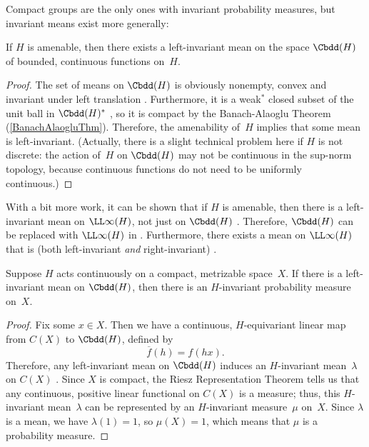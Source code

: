 Compact groups are the only ones with invariant probability measures, but invariant means exist more generally:

\begin{prop}[($\ref{AmenEquiv-amen} \Rightarrow \ref{AmenEquiv-Mean}$)] \label{Amen->Mean}
If $H$ is amenable, then there exists a left-invariant mean on the space $\Cbdd(H)$ of bounded, continuous functions on~$H$.
\end{prop}

\begin{proof}
The set of means on $\Cbdd(H)$ is obviously nonempty, convex and invariant under left translation . Furthermore, it is a weak$^*$ closed subset of the unit ball in $\Cbdd(H)^*$ , so it is compact by the Banach-Alaoglu Theorem (\cref{BanachAlaogluThm}).
Therefore, the amenability of~$H$ implies that some mean is left-invariant.
(Actually, there is a slight technical problem here if $H$ is not discrete: the action of~$H$ on $\Cbdd(H)$ may not be continuous in the sup-norm topology, because continuous functions do not need to be uniformly continuous.)
 \end{proof}

\begin{rem} \label{Amen<>MeanLinfty}
With a bit more work, it can be shown that if $H$ is amenable, then there is a left-invariant mean on $\LL\infty(H)$, not just on $\Cbdd(H)$ .
Therefore, $\Cbdd(H)$ can be replaced with $\LL\infty(H)$ in .
Furthermore, there exists a mean on $\LL\infty(H)$ that is  (both left-invariant \emph{and} right-invariant) .
\end{rem}

\begin{prop}[($\ref{AmenEquiv-Mean} \Rightarrow \ref{AmenEquiv-InvMeas}$)]
Suppose $H$ acts continuously on a compact, metrizable space~$X$. If there is a left-invariant mean on $\Cbdd(H)$, then there is an $H$-invariant probability measure on~$X$.
\end{prop}

\begin{proof}
 Fix some $x \in X$. Then we have a continuous, $H$-equivariant linear map from $C(X)$ to $\Cbdd(H)$, defined by
 	$$ \overline{f}(h) = f(hx) .$$
Therefore, any left-invariant mean on $\Cbdd(H)$ induces an $H$-invariant mean~$\lambda$ on $C(X)$ . Since $X$ is compact, the {Riesz Representation Theorem}  tells us that any continuous, positive linear functional on $C(X)$ is a measure; thus, this $H$-invariant mean~$\lambda$ can be represented by an $H$-invariant measure~$\mu$ on~$X$. Since $\lambda$ is a mean, we have $\lambda(1) = 1$, so $\mu(X) = 1$, which means that $\mu$ is a probability measure.
 \end{proof}




